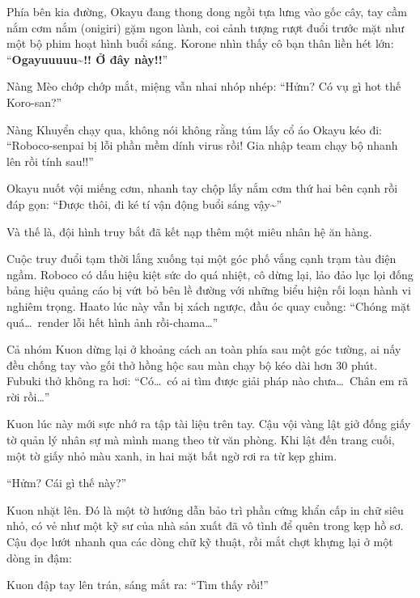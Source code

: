 \documentclass[../main.tex]{subfiles}
\begin{document}
Phía bên kia đường, Okayu đang thong dong ngồi tựa lưng vào gốc cây, tay cầm nắm cơm nắm (onigiri) gặm ngon lành, coi cảnh tượng rượt đuổi trước mặt như một bộ phim hoạt hình buổi sáng. Korone nhìn thấy cô bạn thân liền hét lớn: ``\textbf{Ogayuuuuu\~{}!! Ở đây này!!}''

Nàng Mèo chớp chớp mắt, miệng vẫn nhai nhóp nhép: ``Hửm? Có vụ gì hot thế Koro-san?''

Nàng Khuyển chạy qua, không nói không rằng túm lấy cổ áo Okayu kéo đi: ``Roboco-senpai bị lỗi phần mềm dính virus rồi! Gia nhập team chạy bộ nhanh lên rồi tính sau!!''

Okayu nuốt vội miếng cơm, nhanh tay chộp lấy nắm cơm thứ hai bên cạnh rồi đáp gọn: ``Được thôi, đi ké tí vận động buổi sáng vậy\~{}''

Và thế là, đội hình truy bắt đã kết nạp thêm một miêu nhân hệ ăn hàng.

Cuộc truy đuổi tạm thời lắng xuống tại một góc phố vắng cạnh trạm tàu điện ngầm. Roboco có dấu hiệu kiệt sức do quá nhiệt, cô dừng lại, lảo đảo lục lọi đống bảng hiệu quảng cáo bị vứt bỏ bên lề đường với những biểu hiện rối loạn hành vi nghiêm trọng. Haato lúc này vẫn bị xách ngược, đầu óc quay cuồng: ``Chóng mặt quá\dots\ render lỗi hết hình ảnh rồi-chama\dots''

Cả nhóm Kuon dừng lại ở khoảng cách an toàn phía sau một góc tường, ai nấy đều chống tay vào gối thở hồng hộc sau màn chạy bộ kéo dài hơn 30 phút. Fubuki thở không ra hơi: ``Có\dots\ có ai tìm được giải pháp nào chưa\dots\ Chân em rã rời rồi\dots''

Kuon lúc này mới sực nhớ ra tập tài liệu trên tay. Cậu vội vàng lật giở đống giấy tờ quản lý nhân sự mà mình mang theo từ văn phòng. Khi lật đến trang cuối, một tờ giấy nhỏ màu xanh, in hai mặt bất ngờ rơi ra từ kẹp ghim.

``Hửm? Cái gì thế này?''

Kuon nhặt lên. Đó là một tờ hướng dẫn bảo trì phần cứng khẩn cấp in chữ siêu nhỏ, có vẻ như một kỹ sư của nhà sản xuất đã vô tình để quên trong kẹp hồ sơ. Cậu đọc lướt nhanh qua các dòng chữ kỹ thuật, rồi mắt chợt khựng lại ở một dòng in đậm:


Kuon đập tay lên trán, sáng mắt ra: ``Tìm thấy rồi!''
\end{document}
